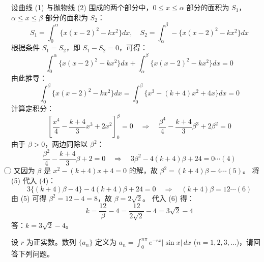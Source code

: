 \begin{questions}
\begin{solution}
    
    设曲线 (1) 与抛物线 (2) 围成的两个部分中，$0 \le x \le \alpha$ 部分的面积为 $S_1$，$\alpha \le x \le \beta$ 部分的面积为 $S_2$：
    \[ S_1 = \int_{0}^{\alpha} \{x(x-2)^2 - kx^2\} dx, \quad S_2 = \int_{\alpha}^{\beta} -\{x(x-2)^2 - kx^2\} dx \]
    根据条件 $S_1 = S_2$，即 $S_1 - S_2 = 0$，可得：
    \[ \int_{0}^{\alpha} \{x(x-2)^2 - kx^2\} dx + \int_{\alpha}^{\beta} \{x(x-2)^2 - kx^2\} dx = 0 \]
    由此推导：
    \[ \int_{0}^{\beta} \{x(x-2)^2 - kx^2\} dx = \int_{0}^{\beta} \{x^3 - (k+4)x^2 + 4x\} dx = 0 \]
    计算定积分：
    \[ \left[ \frac{x^4}{4} - \frac{k+4}{3}x^3 + 2x^2 \right]_0^{\beta} = 0 \quad \Rightarrow \quad \frac{\beta^4}{4} - \frac{k+4}{3}\beta^3 + 2\beta^2 = 0 \]
    由于 $\beta > 0$，两边同除以 $\beta^2$：
    \[ \frac{\beta^2}{4} - \frac{k+4}{3}\beta + 2 = 0 \quad \Rightarrow \quad 3\beta^2 - 4(k+4)\beta + 24 = 0 \cdots (4) \]
\textcircled{}    又因为 $\beta$ 是 $x^2 - (k+4)x + 4 = 0$ 的解，故 $\beta^2 = (k+4)\beta - 4 \cdots (5)$。
    将 (5) 代入 (4)：
    \[ 3\{(k+4)\beta - 4\} - 4(k+4)\beta + 24 = 0 \quad \Rightarrow \quad (k+4)\beta = 12 \cdots (6) \]
    由 (5) 可得 $\beta^2 = 12 - 4 = 8$，故 $\beta = 2\sqrt{2}$。
    代入 (6) 得：
    \[ k = \frac{12}{\beta} - 4 = \frac{12}{2\sqrt{2}} - 4 = 3\sqrt{2} - 4 \]
    答：$k = 3\sqrt{2} - 4$。
\end{solution}

\question
设 $r$ 为正实数。数列 $\{a_n\}$ 定义为 $a_n = \int_0^{n\pi} e^{-rx} |\sin x| \,dx$ ($n = 1, 2, 3, \dots$)，请回答下列问题。
\end{questions}
